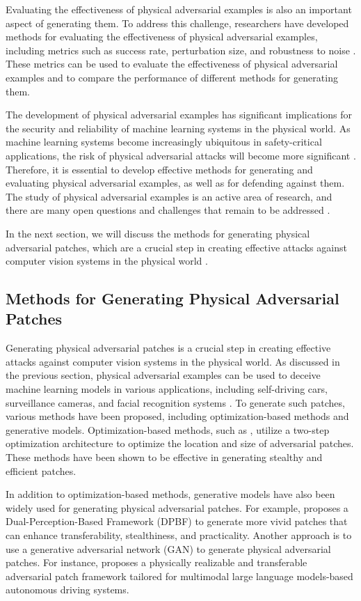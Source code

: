 \documentclass[11pt]{article}
\begin{document}
Evaluating the effectiveness of physical adversarial examples is also an important aspect of generating them. To address this challenge, researchers have developed methods for evaluating the effectiveness of physical adversarial examples, including metrics such as success rate, perturbation size, and robustness to noise \cite{ref81}. These metrics can be used to evaluate the effectiveness of physical adversarial examples and to compare the performance of different methods for generating them.

The development of physical adversarial examples has significant implications for the security and reliability of machine learning systems in the physical world. As machine learning systems become increasingly ubiquitous in safety-critical applications, the risk of physical adversarial attacks will become more significant \cite{ref5}. Therefore, it is essential to develop effective methods for generating and evaluating physical adversarial examples, as well as for defending against them. The study of physical adversarial examples is an active area of research, and there are many open questions and challenges that remain to be addressed \cite{ref7}.

In the next section, we will discuss the methods for generating physical adversarial patches, which are a crucial step in creating effective attacks against computer vision systems in the physical world \cite{ref82}.

\subsection{Methods for Generating Physical Adversarial Patches}

Generating physical adversarial patches is a crucial step in creating effective attacks against computer vision systems in the physical world. As discussed in the previous section, physical adversarial examples can be used to deceive machine learning models in various applications, including self-driving cars, surveillance cameras, and facial recognition systems \cite{ref74}. To generate such patches, various methods have been proposed, including optimization-based methods and generative models. Optimization-based methods, such as \cite{ref83}, utilize a two-step optimization architecture to optimize the location and size of adversarial patches. These methods have been shown to be effective in generating stealthy and efficient patches.

In addition to optimization-based methods, generative models have also been widely used for generating physical adversarial patches. For example, \cite{ref84} proposes a Dual-Perception-Based Framework (DPBF) to generate more vivid patches that can enhance transferability, stealthiness, and practicality. Another approach is to use a generative adversarial network (GAN) to generate physical adversarial patches. For instance, \cite{ref85} proposes a physically realizable and transferable adversarial patch framework tailored for multimodal large language models-based autonomous driving systems.
\end{document}

